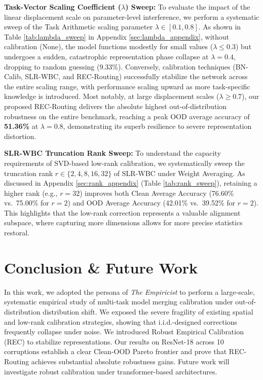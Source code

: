 \documentclass{article}
\theoremstyle{plain}
\theoremstyle{definition}
\theoremstyle{remark}
\begin{document}
\textbf{Task-Vector Scaling Coefficient ($\lambda$) Sweep:} To evaluate the impact of the linear displacement scale on parameter-level interference, we perform a systematic sweep of the Task Arithmetic scaling parameter $\lambda \in [0.1, 0.8]$. As shown in Table \ref{tab:lambda_sweep} in Appendix \ref{sec:lambda_appendix}, without calibration (None), the model functions modestly for small values ($\lambda \leq 0.3$) but undergoes a sudden, catastrophic representation phase collapse at $\lambda = 0.4$, dropping to random guessing (9.33\%). Conversely, calibration techniques (BN-Calib, SLR-WBC, and REC-Routing) successfully stabilize the network across the entire scaling range, with performance scaling upward as more task-specific knowledge is introduced. Most notably, at large displacement scales ($\lambda \geq 0.7$), our proposed REC-Routing delivers the absolute highest out-of-distribution robustness on the entire benchmark, reaching a peak OOD average accuracy of \textbf{51.36\%} at $\lambda = 0.8$, demonstrating its superb resilience to severe representation distortion.

\textbf{SLR-WBC Truncation Rank Sweep:} To understand the capacity requirements of SVD-based low-rank calibration, we systematically sweep the truncation rank $r \in \{2, 4, 8, 16, 32\}$ of SLR-WBC under Weight Averaging. As discussed in Appendix \ref{sec:rank_appendix} (Table \ref{tab:rank_sweep}), retaining a higher rank (e.g., $r = 32$) improves both Clean Average Accuracy (76.60\% vs.\ 75.00\% for $r=2$) and OOD Average Accuracy (42.01\% vs.\ 39.52\% for $r=2$). This highlights that the low-rank correction represents a valuable alignment subspace, where capturing more dimensions allows for more precise statistics restoral.

\section{Conclusion \& Future Work}
In this work, we adopted the persona of \textit{The Empiricist} to perform a large-scale, systematic empirical study of multi-task model merging calibration under out-of-distribution distribution shift. We exposed the severe fragility of existing spatial and low-rank calibration strategies, showing that i.i.d.-designed corrections frequently collapse under noise. We introduced Robust Empirical Calibration (REC) to stabilize representations. Our results on ResNet-18 across 10 corruptions establish a clear Clean-OOD Pareto frontier and prove that REC-Routing achieves substantial absolute robustness gains. Future work will investigate robust calibration under transformer-based architectures.
\end{document}
